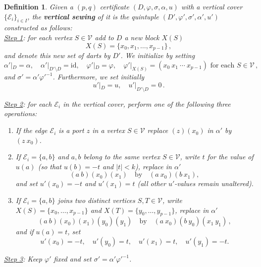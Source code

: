 \documentclass[11pt]{article}
\newtheorem{definition}[theorem]{Definition}
\theoremstyle{remark}
\newcommand{\cV}{\mathcal V}
\newcommand{\cE}{\mathcal E}
\newcommand{\id}{\mathrm{id}}
\begin{document}
\begin{definition}\label{def:VSewing} Given a $(p,q)$ certificate $(D,\varphi, \sigma,\alpha, u)$ with a vertical cover $\{\cE_i\}_{i\in I}$, the {\bf vertical sewing} of it is the quintuple $(D',\varphi', \sigma',\alpha', u')$ constructed as follows: \\

\noindent \underline{Step 1}: for each vertex $S\in \cV$ add to $D$ a new block $X(S)$ 
\[
       X(S)=\{x_0, x_1, \ldots, x_{p-1}\} \, , 
\]
and denote this new set of darts by $D'$. We initialize by setting 
$$ \alpha'|_D = \alpha , \quad \alpha'|_{D' \setminus D} = \id, \quad \varphi'|_D = \varphi , \quad \varphi'|_{X(S)} = (x_0\ x_1\ \cdots\  x_{p-1}) \text{ for each } S \in \cV  \, ,$$
and $\sigma' = \alpha' \varphi'^{-1}$.  Furthermore, we set initially
$$ u'|_D = u , \quad u'|_{D' \setminus D} = 0 \, .$$

\noindent \underline{Step 2}: for each $\cE_i$ in the vertical cover, perform one of the following three
operations:

\begin{enumerate}[(V1),leftmargin=3em]
\item If the edge $\cE_i$ is a port $z$ in a vertex $S\in \cV$ 
replace $(z)(x_0)$ in $\alpha'$  by $(z\ x_0)$.

\item If $\cE_i=\{a,b\}$ and $a,b$ belong to the same vertex $S\in \cV$, write $t$ for the value of $u(a)$ (so that $u(b)=-t$ and  $|t|<k$), replace in $\alpha'$
\begin{equation}\label{eq:Vinternal}
       (a\ b)(x_0)(x_1)
       \quad\text{by}\quad
       (a\ x_0)(b\ x_1),
\end{equation}
and set $u'(x_0)=-t$ and $u'(x_1)=t$ (all other $u'$-values remain unaltered).

\item If $\cE_i=\{a,b\}$ joins two distinct vertices $S,T \in \cV$, write $X(S) = \{x_0,\ldots,x_{p-1}\}$ and $X(T)=\{y_0,\ldots, y_{p-1}\}$, replace in $\alpha'$
\begin{equation}\label{eq:Vcross}
 (a\ b)(x_0)(x_1)(y_0)(y_1)
 \quad\text{by}\quad
 (a\ x_0)(b\ y_0)(x_1\ y_1) \, ,
\end{equation}
and if $u(a)=t$, set
\begin{equation}\label{eq:Vcrossu}
 u'(x_0)=-t,\quad u'(y_0)=t,\quad
 u'(x_1)=t,\quad u'(y_1)=-t.
\end{equation}
\end{enumerate}

\noindent \underline{Step 3}: Keep $\varphi'$ fixed and set $\sigma'=\alpha' \varphi'^{-1}$. \\


\end{definition}
\end{document}
